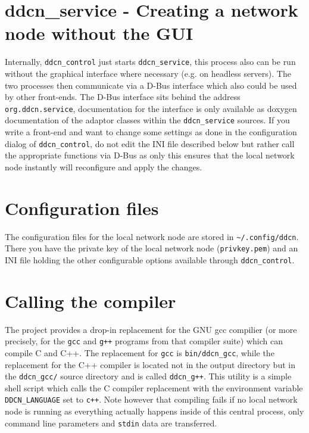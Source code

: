 \documentclass[a4paper,9pt]{scrartcl}
\begin{document}
\section{ddcn\_service - Creating a network node without the GUI}

Internally, \texttt{ddcn\_control} just starts \texttt{ddcn\_service}, this process also can be run without the graphical interface where necessary (e.g. on headless servers). The two processes then communicate via a D-Bus interface which also could be used by other front-ends. The D-Bus interface sits behind the address \texttt{org.ddcn.service}, documentation for the interface is only available as doxygen documentation of the adaptor classes within the \texttt{ddcn\_service} sources. If you write a front-end and want to change some settings as done in the configuration dialog of \texttt{ddcn\_control}, do not edit the INI file described below but rather call the appropriate functions via D-Bus as only this ensures that the local network node instantly will reconfigure and apply the changes.


\section{Configuration files}

The configuration files for the local network node are stored in \texttt{\textasciitilde/.config/ddcn}. There you have the private key of the local network node (\texttt{privkey.pem}) and an INI file holding the other configurable options available through \texttt{ddcn\_control}.

\section{Calling the compiler}

The project provides a drop-in replacement for the GNU gcc compilier (or more precisely, for the \texttt{gcc} and \texttt{g++} programs from that compiler suite) which can compile C and C++. The replacement for \texttt{gcc} is \texttt{bin/ddcn\_gcc}, while the replacement for the C++ compiler is located not in the output directory but in the \texttt{ddcn\_gcc/} source directory and is called \texttt{ddcn\_g++}. This utility is a simple shell script which calls the C compiler replacement with the environment variable \texttt{DDCN\_LANGUAGE} set to \texttt{c++}. Note however that compiling fails if no local network node is running as everything actually happens inside of this central process, only command line parameters and \texttt{stdin} data are transferred.
\end{document}
